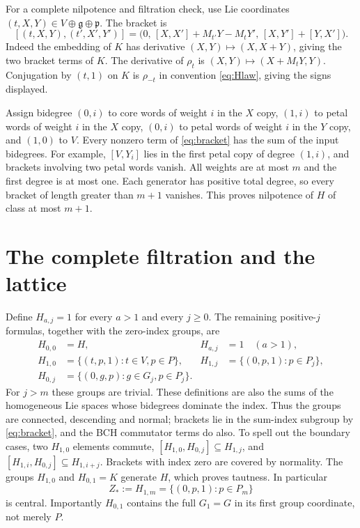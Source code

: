 \documentclass[11pt]{article}
\begin{document}
For a complete nilpotence and filtration check, use Lie coordinates
$(t,X,Y)\in V\oplus\mathfrak g\oplus\mathfrak p$. The bracket is
\begin{equation}\label{eq:bracket}
 [(t,X,Y),(t',X',Y')]
 =\bigl(0,\,[X,X']+M_{t'}Y-M_tY',\,[X,Y']+[Y,X']\bigr).
\end{equation}
Indeed the embedding of $K$ has derivative $(X,Y)\mapsto(X,X+Y)$,
giving the two bracket terms of $K$. The derivative of $\rho_t$ is
$(X,Y)\mapsto(X+M_tY,Y)$. Conjugation by $(t,1)$ on $K$ is
$\rho_{-t}$ in convention \eqref{eq:Hlaw}, giving the signs displayed.

Assign bidegree $(0,i)$ to core words of weight $i$ in the $X$ copy,
$(1,i)$ to petal words of weight $i$ in the $X$ copy, $(0,i)$ to petal
words of weight $i$ in the $Y$ copy, and $(1,0)$ to $V$.
Every nonzero term of \eqref{eq:bracket} has the sum of the input
bidegrees. For example, $[V,Y_i]$ lies in the first petal copy of degree
$(1,i)$, and brackets involving two petal words vanish. All weights are
at most $m$ and the first degree is at most one. Each generator has
positive total degree, so every bracket of length greater than $m+1$
vanishes. This proves nilpotence of $H$ of class at most $m+1$.

\section{The complete filtration and the lattice}
Define $H_{a,j}=1$ for every $a>1$ and every $j\geq0$.
The remaining positive-$j$ formulas, together with the zero-index groups, are
\begin{align*}
 H_{0,0}&=H, & H_{a,j}&=1\quad(a>1),\\
 H_{1,0}&=\{(t,p,1):t\in V,p\in P\},&
 H_{1,j}&=\{(0,p,1):p\in P_j\},\\
 H_{0,j}&=\{(0,g,p):g\in G_j,p\in P_j\}.
\end{align*}
For $j>m$ these groups are trivial. These definitions are also the sums
of the homogeneous Lie spaces whose bidegrees dominate the index.
Thus the groups are connected, descending and normal; brackets lie in
the sum-index subgroup by \eqref{eq:bracket}, and the BCH commutator
terms do also. To spell out the boundary cases, two $H_{1,0}$ elements
commute, $[H_{1,0},H_{0,j}]\subseteq H_{1,j}$, and
$[H_{1,i},H_{0,j}]\subseteq H_{1,i+j}$. Brackets with index zero are
covered by normality. The groups $H_{1,0}$ and $H_{0,1}=K$ generate
$H$, which proves tautness. In particular
\begin{equation}\label{eq:top}
 Z_*:=H_{1,m}=\{(0,p,1):p\in P_m\}
\end{equation}
is central. Importantly $H_{0,1}$ contains the full $G_1=G$ in its first
group coordinate, not merely $P$.
\end{document}
